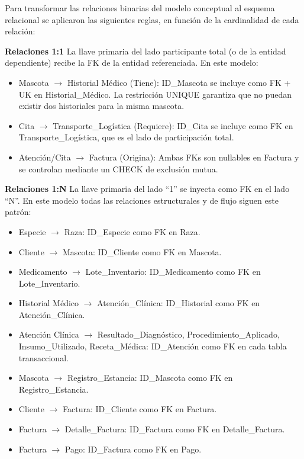Para transformar las relaciones binarias del modelo conceptual al esquema relacional se aplicaron las siguientes reglas, en función de la cardinalidad de cada relación:

\textbf{Relaciones 1:1} La llave primaria del lado participante total (o de la entidad dependiente) recibe la FK de la entidad referenciada. En este modelo:
\begin{itemize}
	\item Mascota $\rightarrow$ Historial Médico (Tiene): ID\_Mascota se incluye como FK + UK en Historial\_Médico. La restricción UNIQUE garantiza que no puedan existir dos historiales para la misma mascota.
	\item Cita $\rightarrow$ Transporte\_Logística (Requiere): ID\_Cita se incluye como FK en Transporte\_Logística, que es el lado de participación total.
	\item Atención/Cita $\rightarrow$ Factura (Origina): Ambas FKs son nullables en Factura y se controlan mediante un CHECK de exclusión mutua.
\end{itemize}

\textbf{Relaciones 1:N} La llave primaria del lado ``1'' se inyecta como FK en el lado ``N''. En este modelo todas las relaciones estructurales y de flujo siguen este patrón:
\begin{itemize}
	\item Especie $\rightarrow$ Raza: ID\_Especie como FK en Raza.
	\item Cliente $\rightarrow$ Mascota: ID\_Cliente como FK en Mascota.
	\item Medicamento $\rightarrow$ Lote\_Inventario: ID\_Medicamento como FK en Lote\_Inventario.
	\item Historial Médico $\rightarrow$ Atención\_Clínica: ID\_Historial como FK en Atención\_Clínica.
	\item Atención Clínica $\rightarrow$ Resultado\_Diagnóstico, Procedimiento\_Aplicado, Insumo\_Utilizado, Receta\_Médica: ID\_Atención como FK en cada tabla transaccional.
	\item Mascota $\rightarrow$ Registro\_Estancia: ID\_Mascota como FK en Registro\_Estancia.
	\item Cliente $\rightarrow$ Factura: ID\_Cliente como FK en Factura.
	\item Factura $\rightarrow$ Detalle\_Factura: ID\_Factura como FK en Detalle\_Factura.
	\item Factura $\rightarrow$ Pago: ID\_Factura como FK en Pago.
\end{itemize}

